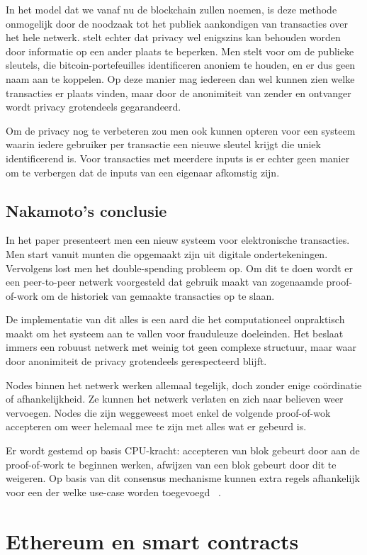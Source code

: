 	In het model dat we vanaf nu de blockchain zullen noemen, is deze methode onmogelijk door de noodzaak tot het publiek aankondigen van transacties over het hele netwerk.  \textcite{Nakamoto2008} stelt echter dat privacy wel enigszins kan behouden worden door informatie op een ander plaats te beperken. Men stelt voor om de publieke sleutels, die bitcoin-portefeuilles identificeren anoniem te houden, en er dus geen naam aan te koppelen. Op deze manier mag iedereen dan wel kunnen zien welke transacties er plaats vinden, maar door de anonimiteit van zender en ontvanger wordt privacy grotendeels gegarandeerd.
	
	Om de privacy nog te verbeteren zou men ook kunnen opteren voor een systeem waarin iedere gebruiker per transactie een nieuwe sleutel krijgt die uniek identificerend is. Voor transacties met meerdere inputs is er echter geen manier om te verbergen dat de inputs van een eigenaar afkomstig zijn.
	\subsection{Nakamoto’s conclusie}
	In het paper presenteert men een nieuw systeem voor elektronische transacties. Men start vanuit munten die opgemaakt zijn uit digitale ondertekeningen. Vervolgens lost men het double-spending probleem op. Om dit te doen wordt er een peer-to-peer netwerk voorgesteld dat gebruik maakt van zogenaamde proof-of-work om de historiek van gemaakte transacties op te slaan. 
	
	De implementatie van dit alles is een aard die het computationeel onpraktisch maakt om het systeem aan te vallen voor frauduleuze doeleinden. Het beslaat immers een robuust netwerk met weinig tot geen complexe structuur, maar waar door anonimiteit de privacy grotendeels gerespecteerd blijft. 
	
	Nodes binnen het netwerk werken allemaal tegelijk, doch zonder enige coördinatie of afhankelijkheid. Ze kunnen het netwerk verlaten en zich naar believen weer vervoegen. Nodes die zijn weggeweest moet enkel de volgende proof-of-wok accepteren om weer helemaal mee te zijn met alles wat er gebeurd is. 
	
	Er wordt gestemd op basis CPU-kracht: accepteren van blok gebeurt door aan de proof-of-work te beginnen werken, afwijzen van een blok gebeurt door dit te weigeren. Op basis van dit consensus mechanisme kunnen extra regels afhankelijk voor een der welke use-case worden toegevoegd ~\autocite{Nakamoto2008}. 
	\newpage
\section{Ethereum en smart contracts}
\label{sec:ethereum-en-smart-contracts}
